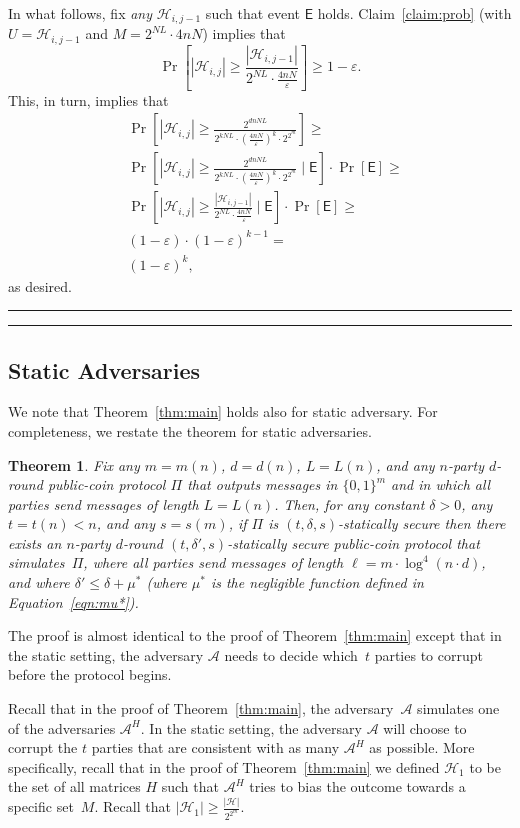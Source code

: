\documentclass[11pt]{article}
\theoremstyle{plain}
\newtheorem{theorem}{Theorem}[section]
\theoremstyle{definition}
\numberwithin{equation}{section}
\newcommand{\qedsymb}{\hfill{\rule{2mm}{2mm}}}
\renewenvironment{proof}{\begin{trivlist} \item[\hspace{\labelsep}{\bf
\noindent Proof.\/}] }{\qedsymb\end{trivlist}}
\numberwithin{equation}{section} \newcommand{\aka} {also known as\ }
\newcommand{\abs}[1]{\left|#1\right|}
\newcommand{\Hc}{\mathcal H}
\def\epsilon{\varepsilon}
\newcommand{\1}{\mathbf{1}}
\newcommand{\Adv}{\mathcal A}
\newcommand{\event}{\mathsf{E}}
\theoremstyle{remark}
\begin{document}
\begin{proof}
\begin{proof}
In what follows, fix {\em any} $\Hc_{i,j-1}$ such that event $\event$ holds.
Claim~\ref{claim:prob} (with  $U=\Hc_{i,j-1}$ and $M=2^{NL}\cdot 4nN$) implies
that
$$
\Pr\left[\abs{\Hc_{i,j}}\geq \frac{\abs{\Hc_{i,j-1}}}{2^{NL}\cdot{\frac{4nN}{\epsilon}}}\right]\geq 1-\epsilon.
$$
This, in turn, implies that
\begin{align*}
 &\Pr\left[\abs{\Hc_{i,j}}\geq\frac{2^{dnN L}}{2^{kNL}\cdot \left(\frac{4nN}{\epsilon}\right)^{k}\cdot 2^{2^m}}\right]\geq\\
 &\Pr\left[\abs{\Hc_{i,j}}\geq\frac{2^{dnN L}}{2^{kNL}\cdot \left(\frac{4nN}{\epsilon}\right)^{k}\cdot 2^{2^m}}\mid \event\right]\cdot\Pr[\event]\geq\\
 &\Pr\left[\abs{\Hc_{i,j}}\geq\frac{\abs{\Hc_{i,j-1}}}{2^{NL}\cdot{\frac{4nN}{\epsilon}}}\mid \event\right]\cdot\Pr[\event]\geq\\
 &(1-\epsilon)\cdot(1-\epsilon)^{k-1}=\\
 &(1-\epsilon)^k,
\end{align*}
as desired.
\end{proof}
\end{proof}

\subsection{Static Adversaries}\label{sec:static}
We note that Theorem~\ref{thm:main} holds also for static adversary. For completeness, we restate the theorem for static adversaries.

\begin{theorem}
 Fix any $m=m(n)$, $d=d(n)$, $L=L(n)$, and any $n$-party $d$-round public-coin
  protocol $\Pi$ that outputs messages in $\{0,1\}^m$ and in which all parties send
  messages of length $L=L(n)$.  Then, for any constant $\delta>0$, any $t=t(n)<n$, and any $s=s(m)$, if $\Pi$ is $(t,\delta,s)$-statically secure then there exists an $n$-party $d$-round
  $(t,\delta',s)$-statically secure public-coin protocol that simulates~$\Pi$, where all parties send messages of length $\ell =
  m\cdot\log^4(n\cdot d)$, and where $\delta'\leq\delta+\mu^*$ (where $\mu^*$ is the negligible function defined in Equation~\eqref{eqn:mu*}).
\end{theorem}

The proof is almost identical to the proof of Theorem~\ref{thm:main} except that in the static setting, the adversary $\Adv$ needs to decide which~$t$ parties to corrupt before the protocol begins.

Recall that in the proof of Theorem~\ref{thm:main}, the adversary~$\Adv$ simulates one of the adversaries $\Adv^H$.  In the static setting, the adversary $\Adv$ will choose to corrupt the $t$ parties that are consistent with as many $\Adv^H$ as possible.
More specifically, recall that in the proof of Theorem~\ref{thm:main} we defined $\Hc_1$ to be the set of all matrices $H$ such that $\Adv^H$ tries to bias the outcome towards a specific set~$M$. Recall that $\abs{\Hc_1}\geq\frac{\abs{\Hc}}{2^{2^m}}$.
\end{document}
